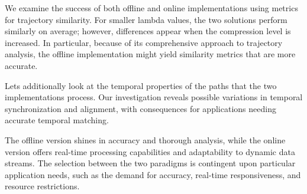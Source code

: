 We examine the success of both offline and online implementations using metrics for trajectory similarity. For smaller lambda values, the two solutions perform similarly on average; however, differences appear when the compression level is increased. In particular, because of its comprehensive approach to trajectory analysis, the offline implementation might yield similarity metrics that are more accurate.

Lets additionally look at the temporal properties of the paths that the two implementations process. Our investigation reveals possible variations in temporal synchronization and alignment, with consequences for applications needing accurate temporal matching.

The offline version shines in accuracy and thorough analysis, while the online version offers real-time processing capabilities and adaptability to dynamic data streams. The selection between the two paradigms is contingent upon particular application needs, such as the demand for accuracy, real-time responsiveness, and resource restrictions.




